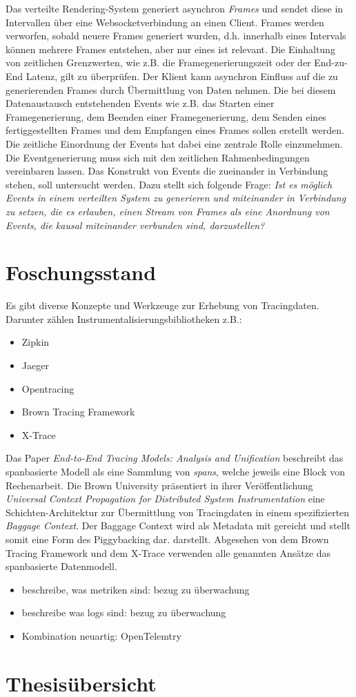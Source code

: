 	Das verteilte Rendering-System generiert asynchron \emph{Frames} und sendet diese in Intervallen über eine Websocketverbindung an einen Client. Frames werden verworfen, sobald neuere Frames generiert wurden, d.h. innerhalb eines Intervals können mehrere Frames entstehen, aber nur eines ist relevant. Die Einhaltung von zeitlichen Grenzwerten, wie z.B. die Framegenerierungszeit oder der End-zu-End Latenz, gilt zu überprüfen. Der Klient kann asynchron Einfluss auf die zu generierenden Frames durch Übermittlung von Daten nehmen. Die bei diesem Datenaustausch entstehenden Events wie z.B. das Starten einer Framegenerierung, dem Beenden einer Framegenerierung, dem Senden eines fertiggestellten Frames und dem Empfangen eines Frames sollen erstellt werden. Die zeitliche Einordnung der Events hat dabei eine zentrale Rolle einzunehmen. Die Eventgenerierung muss sich mit den zeitlichen Rahmenbedingungen vereinbaren lassen. Das Konstrukt von Events die zueinander in Verbindung stehen, soll untersucht werden. Dazu stellt sich folgende Frage: \emph{Ist es möglich Events in einem verteilten System zu generieren und miteinander in Verbindung zu setzen, die es erlauben, einen Stream von Frames als eine Anordnung von Events, die kausal miteinander verbunden sind, darzustellen?}
\section{Foschungsstand}
\label{section:Forschungsstand}

Es gibt diverse Konzepte und Werkzeuge zur Erhebung von Tracingdaten. Darunter zählen Instrumentalisierungsbibliotheken z.B.:
\begin{itemize}
	\item Zipkin
	\item Jaeger
	\item Opentracing
	\item Brown Tracing Framework
	\item X-Trace
\end{itemize}
Das Paper \emph{End-to-End Tracing Models: Analysis and Unification} beschreibt das spanbasierte Modell als eine Sammlung von \emph{spans}, welche jeweils eine Block von Rechenarbeit. Die Brown University präsentiert in ihrer Veröffentlichung \emph{Universal Context Propagation for Distributed System Instrumentation} eine Schichten-Architektur zur Übermittlung von Tracingdaten in einem spezifizierten \emph{Baggage Context}. Der Baggage Context wird als Metadata mit gereicht und stellt somit eine Form des Piggybacking dar. darstellt. 
Abgesehen von dem Brown Tracing Framework und dem X-Trace verwenden alle genannten Ansätze das spanbasierte Datenmodell.
\begin{itemize}
\item beschreibe, was metriken sind: bezug zu überwachung
\item beschreibe was logs sind: bezug zu überwachung
\item Kombination neuartig: OpenTelemtry
\end{itemize}

\section{Thesisübersicht}
\label{section:Thesisübersicht}
